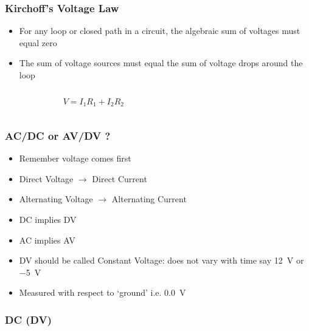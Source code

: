 \documentclass[svgnames,x11names]{beamer}
\begin{document}
\begin{frame}\frametitle{Kirchoff’s Voltage Law}
  \begin{itemize}
  \item For any loop or closed path in a circuit, the algebraic sum
    of voltages must equal zero
  \item The sum of voltage sources must equal the sum of voltage drops
    around the loop
  \end{itemize}
  \begin{columns}[onlytextwidth]
    \begin{column}{0.5\textwidth}
      \[ V = I_1 R_1 + I_2 R_2 \]
    \end{column}
    \begin{column}{0.5\textwidth}
    \end{column}
  \end{columns}
\end{frame}

\begin{frame}
  \frametitle{AC/DC or AV/DV ? }
  \begin{itemize}
  \item Remember voltage comes first
  \item Direct Voltage $\rightarrow$ Direct Current
  \item Alternating Voltage $\rightarrow$ Alternating Current
  \item DC implies DV
  \item AC implies AV
  \item DV should be called Constant Voltage: does not vary with time
    say \SI{+12}{\volt} or \SI{-5}{\volt}
  \item Measured with respect to ‘ground’ i.e. \SI{0.0}{V}
  \end{itemize}
\end{frame}

\begin{frame}
  \frametitle{DC (DV)}
\end{frame}
\end{document}
